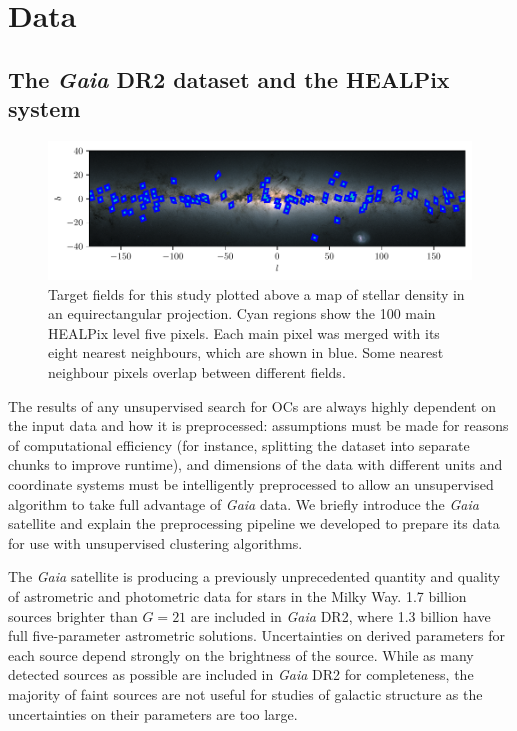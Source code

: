 

\section{Data}\label{c2:sec:data}
\subsection{The \emph{Gaia} DR2 dataset and the HEALPix system}

\begin{figure}
   \centering
   \includegraphics[width=\textwidth]{fig/c2/fig_fields.pdf}
   \caption[Target fields for this study plotted above a  \emph{} map of stellar density in an equirectangular projection]{Target fields for this study plotted above a  \emph{} map of stellar density in an equirectangular projection. Cyan regions show the 100 main HEALPix level five pixels. Each main pixel was merged with its eight nearest neighbours, which are shown in blue. Some nearest neighbour pixels overlap between different fields.}\label{c2:fig:targetfields}%
\end{figure}

The results of any unsupervised search for OCs are always highly dependent on the input data and how it is preprocessed: assumptions must be made for reasons of computational efficiency (for instance, splitting the dataset into separate chunks to improve runtime), and dimensions of the data with different units and coordinate systems must be intelligently preprocessed to allow an unsupervised algorithm to take full advantage of \emph{Gaia} data. We briefly introduce the \emph{Gaia} satellite and explain the preprocessing pipeline we developed to prepare its data for use with unsupervised clustering algorithms.

The \emph{Gaia} satellite is producing a previously unprecedented quantity and quality of astrometric and photometric data for stars in the Milky Way. 1.7 billion sources brighter than $G=21$ are included in \emph{Gaia} DR2, where 1.3 billion have full five-parameter astrometric solutions. Uncertainties on derived parameters for each source depend strongly on the brightness of the source. While as many detected sources as possible are included in \emph{Gaia} DR2 for completeness, the majority of faint sources are not useful for studies of galactic structure as the uncertainties on their parameters are too large. 

